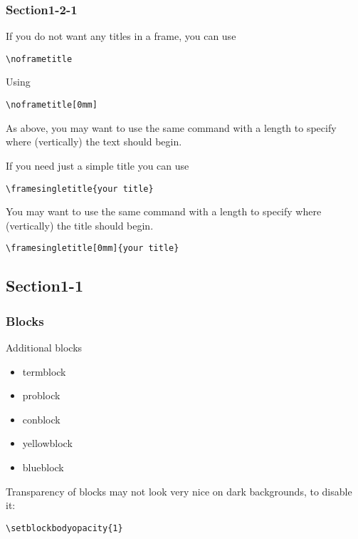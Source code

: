\documentclass[t,compress,aspectratio=169]{beamer}
\begin{document}
\subsubsection{Section1-2-1}
\begin{frame}[fragile]
\noframetitle
If you do not want any titles in a frame, you can use
\begin{lstlisting}
\noframetitle
\end{lstlisting}
\end{frame}

\begin{frame}[fragile]
\noframetitle[0mm]
Using 
\begin{lstlisting}
\noframetitle[0mm]
\end{lstlisting}

\vskip 5mm
As above, you may want to use the same command with a length to specify where (vertically) the text should begin.
\end{frame}

\begin{frame}[fragile]
If you need just a simple title you can use
\begin{lstlisting}
\framesingletitle{your title}
\end{lstlisting}

You may want to use the same command with a length to specify where (vertically) the title should begin.
\begin{lstlisting}
\framesingletitle[0mm]{your title}
\end{lstlisting}
\end{frame}

\subsection{Section1-1}
\begin{frame}[fragile]
\frametitle{Blocks}
\begin{block}{Additional blocks}
\begin{itemize}
  \item termblock
  \item problock
  \item conblock
  \item yellowblock
  \item blueblock
\end{itemize}
\end{block}
Transparency of blocks may not look very nice on dark backgrounds, to disable it:
\begin{lstlisting}
\setblockbodyopacity{1}
\end{lstlisting}
\end{frame}
\end{document}
